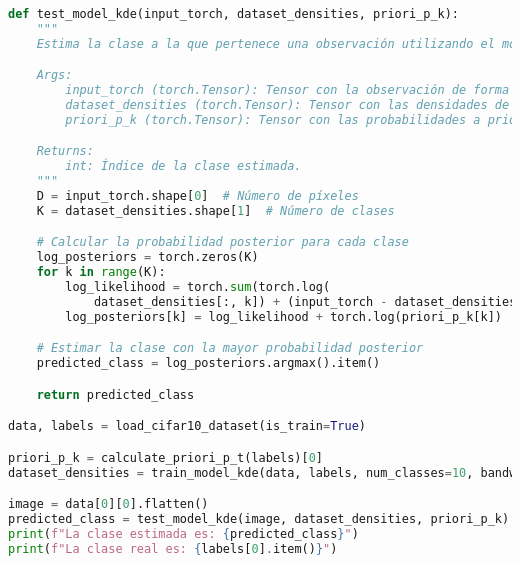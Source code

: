 \documentclass[spanish]{article}
\begin{document}
\begin{lstlisting}[language=Python, caption=Implementacion Test Model KDE]
def test_model_kde(input_torch, dataset_densities, priori_p_k):
    """
    Estima la clase a la que pertenece una observación utilizando el modelo KDE.

    Args:
        input_torch (torch.Tensor): Tensor con la observación de forma [D].
        dataset_densities (torch.Tensor): Tensor con las densidades de cada píxel para cada clase de forma [D, K].
        priori_p_k (torch.Tensor): Tensor con las probabilidades a priori de cada clase.

    Returns:
        int: Índice de la clase estimada.
    """
    D = input_torch.shape[0]  # Número de píxeles
    K = dataset_densities.shape[1]  # Número de clases

    # Calcular la probabilidad posterior para cada clase
    log_posteriors = torch.zeros(K)
    for k in range(K):
        log_likelihood = torch.sum(torch.log(
            dataset_densities[:, k]) + (input_torch - dataset_densities[:, k].log()))
        log_posteriors[k] = log_likelihood + torch.log(priori_p_k[k])

    # Estimar la clase con la mayor probabilidad posterior
    predicted_class = log_posteriors.argmax().item()

    return predicted_class

data, labels = load_cifar10_dataset(is_train=True)

priori_p_k = calculate_priori_p_t(labels)[0]
dataset_densities = train_model_kde(data, labels, num_classes=10, bandwidth=0.5)

image = data[0][0].flatten()
predicted_class = test_model_kde(image, dataset_densities, priori_p_k)
print(f"La clase estimada es: {predicted_class}")
print(f"La clase real es: {labels[0].item()}")

\end{lstlisting}
\end{document}
